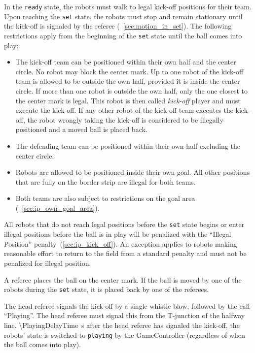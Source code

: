 In the \texttt{ready} state, the robots must walk to legal kick-off positions for their team.
Upon reaching the \texttt{set} state, the robots must stop and remain stationary until the kick-off is signaled by the referee (\cf~\cref{sec:motion_in_set}).
The following restrictions apply from the beginning of the \texttt{set} state until the ball comes into play:
\begin{itemize}
  \item The kick-off team can be positioned within their own half and the center circle.
    No robot may block the center mark.
    Up to one robot of the kick-off team is allowed to be outside the own half, provided it is inside the center circle.
    If more than one robot is outside the own half, only the one closest to the center mark is legal.
    This robot is then called \emph{kick-off} player and must execute the kick-off.
    If any other robot of the kick-off team executes the kick-off, the robot wrongly taking the kick-off is considered to be illegally positioned and a moved ball is placed back.
  \item The defending team can be positioned within their own half excluding the center circle.
  \item Robots are allowed to be positioned inside their own goal.
    All other positions that are fully on the border strip are illegal for both teams.
  \item Both teams are also subject to restrictions on the goal area (\cf~\cref{sec:ip_own_goal_area}).
\end{itemize}
All robots that do not reach legal positions before the \texttt{set} state begins or enter illegal positions before the ball is in play will be penalized with the ``Illegal Position'' penalty~(\cf \cref{sec:ip_kick_off}).
An exception applies to robots making reasonable effort to return to the field from a standard penalty and must not be penalized for illegal position.


A referee places the ball on the center mark.
If the ball is moved by one of the robots during the \texttt{set} state, it is placed back by one of the referees.

The head referee signals the kick-off by a single whistle blow, followed by the call ``Playing''.
The head referee must signal this from the T-junction of the halfway line.
\qty{\PlayingDelayTime}{\second} after the head referee has signaled the kick-off, the robots' state is switched to \texttt{playing} by the GameController (regardless of when the ball comes into play).

